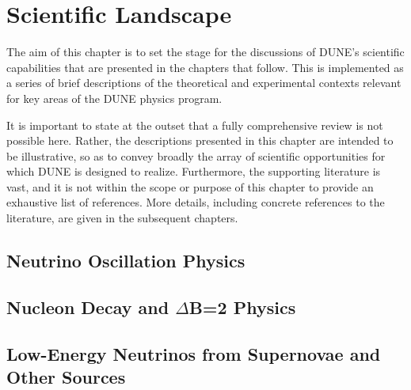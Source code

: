 \chapter{Scientific Landscape}
\label{ch:physics-landscape}

The aim of this chapter is to set the stage for the discussions of 
DUNE's scientific capabilities that are presented in the chapters 
that follow.  This is implemented as a series of brief 
descriptions of the theoretical and experimental contexts relevant 
for key areas of the DUNE physics program. 

It is important to state at the outset that a fully comprehensive 
review is not possible here.  Rather, the descriptions presented 
in this chapter are intended to be illustrative, so as to 
convey broadly the array of scientific opportunities for which 
DUNE is designed to realize.
Furthermore, the supporting literature is vast, and it is 
not within the scope or purpose of this chapter to provide an 
exhaustive list of references. 
More details, including concrete references to the literature, 
are given in the subsequent chapters.

\section{Neutrino Oscillation Physics}
\label{sec:landscape-osc}



\section{Nucleon Decay and $\Delta$B=2 Physics}
\label{sec:landscape-ndk}



%
\section{Low-Energy Neutrinos from Supernovae and Other Sources}
\label{sec:landscape-snb}


